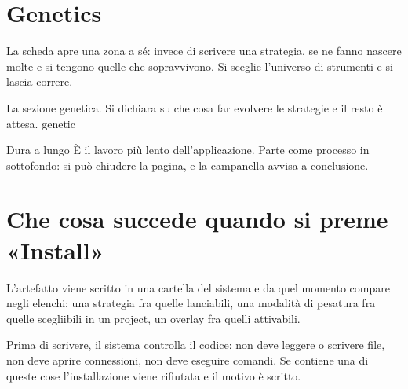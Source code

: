 \section{Genetics}\label{sez:studio-genetica}

La scheda  apre una zona a sé: invece di scrivere una
strategia, se ne fanno nascere molte e si tengono quelle che sopravvivono.
Si sceglie l'universo di strumenti e si lascia correre.

  {La sezione genetica. Si dichiara su che cosa far evolvere le strategie e
   il resto è attesa.}
  {genetic}

\begin{nota}{Dura a lungo}
È il lavoro più lento dell'applicazione. Parte come processo in sottofondo:
si può chiudere la pagina, e la campanella avvisa a conclusione.
\end{nota}

\section{Che cosa succede quando si preme «Install»}\label{sez:studio-install}

L'artefatto viene scritto in una cartella del sistema e da quel momento
compare negli elenchi: una strategia fra quelle lanciabili, una modalità di
pesatura fra quelle scegliibili in un project, un overlay fra quelli
attivabili.

Prima di scrivere, il sistema controlla il codice: non deve leggere o
scrivere file, non deve aprire connessioni, non deve eseguire comandi. Se
contiene una di queste cose l'installazione viene rifiutata e il motivo è
scritto.
